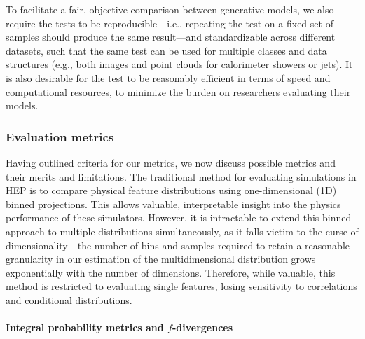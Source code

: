 To facilitate a fair, objective comparison between generative models, we also require the tests to be reproducible---i.e., repeating the test on a fixed set of samples should produce the same result---and standardizable across different datasets, such that the same test can be used for multiple classes and data structures (e.g., both images and point clouds for calorimeter showers or jets).
It is also desirable for the test to be reasonably efficient in terms of speed and computational resources, to minimize the burden on researchers evaluating their models.

\subsubsection{Evaluation metrics}
\label{sec:04_evaluating_emetrics}

Having outlined criteria for our metrics, we now discuss possible metrics and their merits and limitations.
The traditional method for evaluating simulations in HEP is to compare physical feature distributions using one-dimensional (1D) binned projections.
This allows valuable, interpretable insight into the physics performance of these simulators.
However, it is intractable to extend this binned approach to multiple distributions simultaneously, as it falls victim to the curse of dimensionality---the number of bins and samples required to retain a reasonable granularity in our estimation of the multidimensional distribution grows exponentially with the number of dimensions.
Therefore, while valuable, this method is restricted to evaluating single features, losing sensitivity to correlations and conditional distributions.

\paragraph{Integral probability metrics and \texorpdfstring{$f$}{f}-divergences}
\label{sec:04_evaluating_ipmsfdivs}

